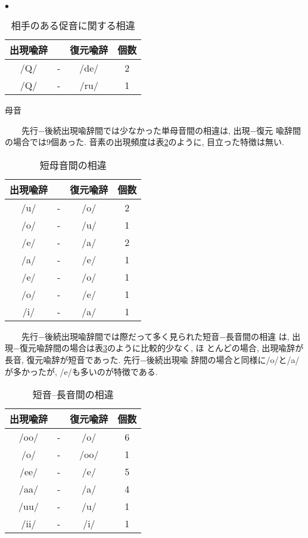\begin{list}{\Large $\bullet$}{}
\begin{table}
\begin{center}
\caption{相手のある促音に関する相違}\label{different5}
\begin{tabular}{cccc}
出現喩辞 && 復元喩辞 & 個数\\\hline
/Q/ & - & /de/ & 2\\
/Q/ & - & /ru/ & 1\\
\end{tabular}
\end{center}
\end{table}

\item 母音

\ \ \ \ 先行−後続出現喩辞間では少なかった単母音間の相違は, 出現−復元
喩辞間の場合では9個あった. 音素の出現頻度は表\ref{different6}のように, 
目立った特徴は無い. 

\begin{table}
\begin{center}
\caption{短母音間の相違}\label{different6}
\begin{tabular}{cccc}
出現喩辞 && 復元喩辞 & 個数\\\hline
/u/ & - & /o/ & 2\\
/o/ & - & /u/ & 1\\
/e/ & - & /a/ & 2\\
/a/ & - & /e/ & 1\\
/e/ & - & /o/ & 1\\
/o/ & - & /e/ & 1\\
/i/ & - & /a/ & 1\\
\end{tabular}
\end{center}
\end{table}

\ \ \ \ 先行−後続出現喩辞間では際だって多く見られた短音−長音間の相違
は, 出現−復元喩辞間の場合は表\ref{different7}のように比較的少なく, ほ
とんどの場合, 出現喩辞が長音, 復元喩辞が短音であった. 先行−後続出現喩
辞間の場合と同様に/o/と/a/が多かったが, /e/も多いのが特徴である. 

\begin{table}
\begin{center}
\caption{短音--長音間の相違}\label{different7}
\begin{tabular}{cccc}
出現喩辞 && 復元喩辞 & 個数\\\hline
/oo/ & - & /o/ & 6\\
/o/ & - & /oo/ & 1\\
/ee/ & - & /e/ & 5\\
/aa/ & - & /a/ & 4\\
/uu/ & - & /u/ & 1\\
/ii/ & - & /i/ & 1\\
\end{tabular}
\end{center}
\end{table}


\end{list}
